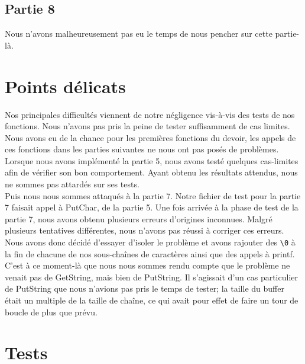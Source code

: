 \documentclass[a4paper]{article}
\newcommand*{\escape}[1]{\texttt{\textbackslash#1}}
\begin{document}
\subsection{Partie 8}
Nous n'avons malheureusement pas eu le temps de nous pencher sur cette partie-là.


\newpage
\section{Points délicats}

Nos principales difficultés viennent de notre négligence vis-à-vis des tests de
nos fonctions. Nous n'avons pas pris la peine de tester suffisamment de cas limites.
Nous avons eu de la chance pour les premières fonctions du devoir, les appels de
ces fonctions dans les parties suivantes ne nous ont pas posés de problèmes. \\

Lorsque nous avons implémenté la partie 5, nous avons testé quelques cas-limites
afin de vérifier son bon comportement. Ayant obtenu les résultats attendus, nous
ne sommes pas attardés sur ses tests. \\

Puis nous nous sommes attaqués à la partie 7. Notre fichier de test pour la partie
7 faisait appel à PutChar, de la partie 5. Une fois arrivée à la phase de test de
la partie 7, nous avons obtenu plusieurs erreurs d'origines inconnues. Malgré
plusieurs tentatives différentes, nous n'avons pas réussi à corriger ces erreurs.
Nous avons donc décidé d'essayer d'isoler le problème et avons rajouter des \escape{0}
à la fin de chacune de nos sous-chaînes de caractères ainsi que des appels à printf.
C'est à ce moment-là que nous nous sommes rendu compte que le problème ne venait
pas de GetString, mais bien de PutString. Il s'agissait d'un cas particulier de
PutString que nous n'avions pas pris le temps de tester; la taille du buffer était
un multiple de la taille de chaîne, ce qui avait pour effet de faire un tour de boucle
de plus que prévu.\\


\section{Tests}
\end{document}
